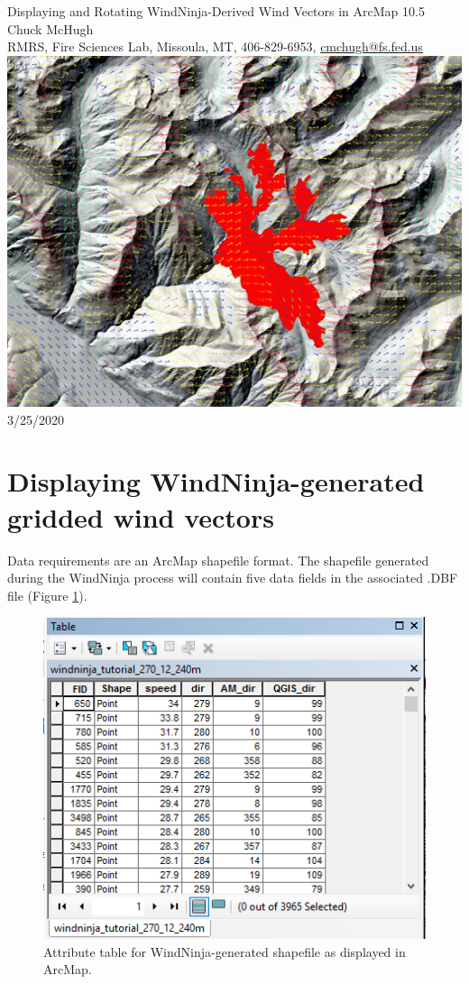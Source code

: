 \documentclass[12pt]{article}
\begin{document}
\begin{titlepage}
    \centering
    {\Huge
        Displaying and Rotating WindNinja-Derived
Wind Vectors in ArcMap 10.5
    }
    \vfill
    {\Large
    Chuck McHugh\\ RMRS, Fire Sciences Lab, Missoula, MT, 406-829-6953, \href{mailto:cmchugh@fs.fed.us}{cmchugh@fs.fed.us}
    }
    \vfill
    \includegraphics[scale=0.6]							{arc_00.png}
    \vfill
  	{\Huge
	  3/25/2020 %
  	}
    \vfill
\end{titlepage}

\section*{Displaying WindNinja-generated gridded wind vectors}
Data requirements are an ArcMap shapefile format. The shapefile generated during the WindNinja process will
contain five data fields in the associated .DBF file (Figure \ref{fig:Figure1}).

\begin{figure}[H]
	\centering
	\includegraphics[scale=0.9]{arc_1.png}
	\caption{Attribute table for WindNinja-generated shapefile as displayed in ArcMap.}
	\label{fig:Figure1}
\end{figure}
\end{document}
